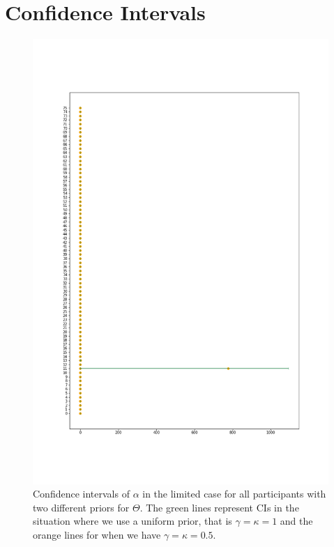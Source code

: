 \chapter{Confidence Intervals}
\label{appendix_CIs}
\begin{figure}
    \centering
    \includegraphics[scale=0.37]{pictures/Sensitivity/ci_lim_alpha.png}
    \caption[CIs for $\alpha$ in the limited case]{Confidence intervals of $\alpha$ in the limited case for all participants with two different priors for $\Theta$. The green lines represent CIs in the situation where we use a uniform prior, that is $\gamma=\kappa=1$ and the orange lines for when we have $\gamma=\kappa=0.5$.}
    \label{fig:sensitivity_cis_lim_alpha}
\end{figure}


